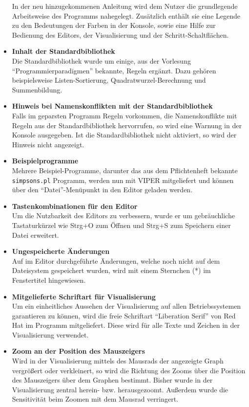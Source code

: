 \documentclass[parskip=full,11pt,twoside]{scrartcl}
\begin{document}
\begin{itemize}
        In der neu hinzugekommenen Anleitung wird dem Nutzer die grundlegende Arbeitsweise des Programms nahegelegt. Zusätzlich enthält sie eine Legende zu den Bedeutungen der Farben in der Konsole, sowie eine Hilfe zur Bedienung des Editors, der Visualisierung und der Schritt-Schaltflächen.
  \item \textbf{Inhalt der Standardbibliothek}\\
        Die Standardbibliothek wurde um einige, aus der Vorlesung \enquote{Programmierparadigmen} bekannte, Regeln ergänzt. Dazu gehören beispielsweise Listen-Sortierung, Quadratwurzel-Berechnung und Summenbildung.
  \item \textbf{Hinweis bei Namenskonflikten mit der Standardbibliothek}\\
        Falls im geparsten Programm Regeln vorkommen, die Namenskonflikte mit Regeln aus der Standardbibliothek hervorrufen, so wird eine Warnung in der Konsole ausgegeben. Ist die Standardbibliothek nicht aktiviert, so wird der Hinweis nicht angezeigt.
  \item \textbf{Beispielprogramme}\\
        Mehrere Beispiel-Programme, darunter das aus dem Pflichtenheft bekannte \texttt{simpsons.pl} Programm, werden nun mit VIPER mitgeliefert und können über den \enquote{Datei}-Menüpunkt in den Editor geladen werden.
  \item \textbf{Tastenkombinationen für den Editor}\\
        Um die Nutzbarkeit des Editors zu verbessern, wurde er um gebräuchliche Tastaturkürzel wie Strg+O zum Öffnen und Strg+S zum Speichern einer Datei erweitert.
  \item \textbf{Ungespeicherte Änderungen}\\
        Auf im Editor durchgeführte Änderungen, welche noch nicht auf dem Dateisystem gespeichert wurden, wird mit einem Sternchen (*) im Fenstertitel hingewiesen.
  \item \textbf{Mitgelieferte Schriftart für Visualisierung}\\
        Um ein einheitliches Aussehen der Visualisierung auf allen Betriebssystemen garantieren zu können, wird die freie Schriftart \enquote{Liberation Serif} von Red Hat im Programm mitgeliefert. Diese wird für alle Texte und Zeichen in der Visualisierung verwendet.
  \item \textbf{Zoom an der Position des Mauszeigers}\\
        Wird in der Visualisierung mittels des Mausrads der angezeigte Graph vergrößert oder verkleinert, so wird die Richtung des Zooms über die Position des Mauszeigers über dem Graphen bestimmt. Bisher wurde in der Visualisierung zentral herein- bzw. herausgezoomt. Außerdem wurde die Sensitivität beim Zoomen mit dem Mausrad verringert.

\end{itemize}
\end{document}

